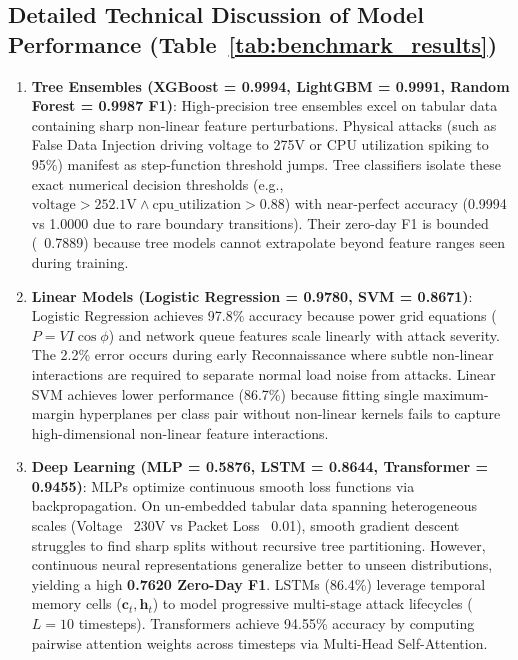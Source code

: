 \documentclass[conference]{IEEEtran}
\begin{document}
\subsection{Detailed Technical Discussion of Model Performance (Table~\ref{tab:benchmark_results})}
\label{subsec:benchmark_discussion}

\begin{enumerate}
    \item \textbf{Tree Ensembles (XGBoost = 0.9994, LightGBM = 0.9991, Random Forest = 0.9987 F1)}: High-precision tree ensembles excel on tabular data containing sharp non-linear feature perturbations. Physical attacks (such as False Data Injection driving voltage to 275V or CPU utilization spiking to 95\%) manifest as step-function threshold jumps. Tree classifiers isolate these exact numerical decision thresholds (e.g., $\text{voltage} > 252.1\text{V} \land \text{cpu\_utilization} > 0.88$) with near-perfect accuracy (0.9994 vs 1.0000 due to rare boundary transitions). Their zero-day F1 is bounded (~0.7889) because tree models cannot extrapolate beyond feature ranges seen during training.
    
    \item \textbf{Linear Models (Logistic Regression = 0.9780, SVM = 0.8671)}: Logistic Regression achieves 97.8\% accuracy because power grid equations ($P = V I \cos\phi$) and network queue features scale linearly with attack severity. The 2.2\% error occurs during early Reconnaissance where subtle non-linear interactions are required to separate normal load noise from attacks. Linear SVM achieves lower performance (86.7\%) because fitting single maximum-margin hyperplanes per class pair without non-linear kernels fails to capture high-dimensional non-linear feature interactions.
    
    \item \textbf{Deep Learning (MLP = 0.5876, LSTM = 0.8644, Transformer = 0.9455)}: MLPs optimize continuous smooth loss functions via backpropagation. On un-embedded tabular data spanning heterogeneous scales (Voltage ~230V vs Packet Loss ~0.01), smooth gradient descent struggles to find sharp splits without recursive tree partitioning. However, continuous neural representations generalize better to unseen distributions, yielding a high \textbf{0.7620 Zero-Day F1}. LSTMs (86.4\%) leverage temporal memory cells ($\mathbf{c}_t, \mathbf{h}_t$) to model progressive multi-stage attack lifecycles ($L=10$ timesteps). Transformers achieve 94.55\% accuracy by computing pairwise attention weights across timesteps via Multi-Head Self-Attention.
    

\end{enumerate}
\end{document}
